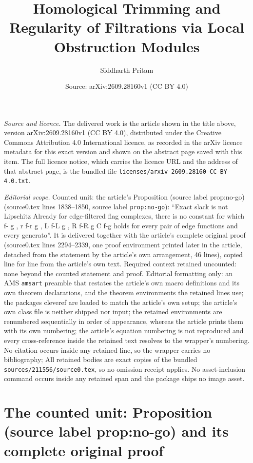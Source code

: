 \documentclass[10pt,a4paper]{amsart}
\title[Homological Trimming and Regularity of Filtrations via Local Obstruction Modules]{Homological Trimming and Regularity of Filtrations via Local Obstruction Modules}
\author{Siddharth Pritam}
\date{Source: arXiv:2609.28160v1 (CC BY 4.0)}
\theoremstyle{plain}
\theoremstyle{definition}
\begin{document}
\maketitle

\noindent\emph{Source and licence.} The delivered work is the article shown in the title above, version arXiv:2609.28160v1 (CC BY 4.0), distributed under the Creative Commons Attribution 4.0 International licence, as recorded in the arXiv licence metadata for this exact version and shown on the abstract page saved with this item. The full licence notice, which carries the licence URL and the address of that abstract page, is the bundled file \texttt{licenses/arxiv-2609.28160-CC-BY-4.0.txt}.
\par\smallskip

\noindent\textit{Editorial scope.} Counted unit: the article's Proposition (source label prop:no-go) (source0.tex lines 1838--1850, source label \texttt{prop:no-go}): ``Exact slack is not Lipschitz Already for edge-filtered flag complexes, there is no constant for which f- g , r f-r g , L f-L g , R f-R g C f-g holds for every pair of edge functions and every generato''. It is delivered together with the article's complete original proof (source0.tex lines 2294--2339, one proof environment printed later in the article, detached from the statement by the article's own arrangement, 46 lines), copied line for line from the article's own text. Required context retained uncounted: none beyond the counted statement and proof. Editorial formatting only: an AMS \texttt{amsart} preamble that restates the article's own macro definitions and its own theorem declarations, and the theorem environments the retained lines use; the packages cleveref are loaded to match the article's own setup; the article's own class file is neither shipped nor input; the retained environments are renumbered sequentially in order of appearance, whereas the article prints them with its own numbering; the article's equation numbering is not reproduced and every cross-reference inside the retained text resolves to the wrapper's numbering. No citation occurs inside any retained line, so the wrapper carries no bibliography; All retained bodies are exact copies of the bundled \texttt{sources/211556/source0.tex}, so no omission receipt applies. No asset-inclusion command occurs inside any retained span and the package ships no image asset.


\section{The counted unit: Proposition (source label prop:no-go) and its complete original proof}
\end{document}
